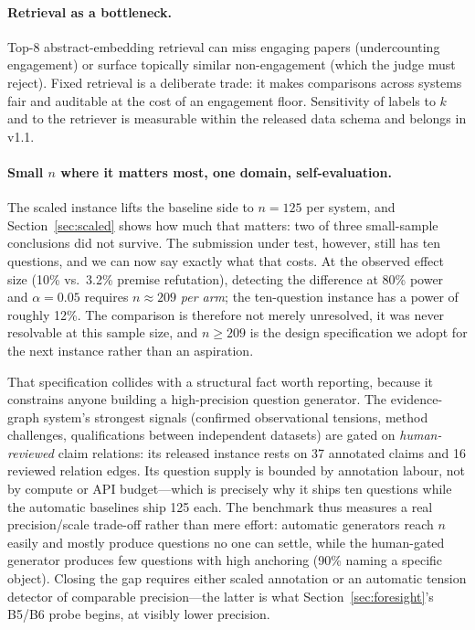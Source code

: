 \paragraph{Retrieval as a bottleneck.} Top-8 abstract-embedding
retrieval can miss engaging papers (undercounting engagement) or
surface topically similar non-engagement (which the judge must reject).
Fixed retrieval is a deliberate trade: it makes comparisons across
systems fair and auditable at the cost of an engagement floor.
Sensitivity of labels to $k$ and to the retriever is measurable within
the released data schema and belongs in v1.1.

\paragraph{Small $n$ where it matters most, one domain,
self-evaluation.} The scaled instance lifts the baseline side to
$n=125$ per system, and Section~\ref{sec:scaled} shows how much that
matters: two of three small-sample conclusions did not survive. The
submission under test, however, still has ten questions, and we can now
say exactly what that costs. At the observed effect size (10\% vs.\
3.2\% premise refutation), detecting the difference at 80\% power and
$\alpha=0.05$ requires $n\approx209$ \emph{per arm}; the ten-question
instance has a power of roughly 12\%. The comparison is therefore not
merely unresolved, it was never resolvable at this sample size, and
$n\geq209$ is the design specification we adopt for the next instance
rather than an aspiration.

That specification collides with a structural fact worth reporting,
because it constrains anyone building a high-precision question
generator. The evidence-graph system's strongest signals (confirmed
observational tensions, method challenges, qualifications between
independent datasets) are gated on \emph{human-reviewed} claim
relations: its released instance rests on 37 annotated claims and 16
reviewed relation edges. Its question supply is bounded by annotation
labour, not by compute or API budget---which is precisely why it ships
ten questions while the automatic baselines ship 125 each. The
benchmark thus measures a real precision/scale trade-off rather than
mere effort: automatic generators reach $n$ easily and mostly produce
questions no one can settle, while the human-gated generator produces
few questions with high anchoring (90\% naming a specific object).
Closing the gap requires either scaled annotation or an automatic
tension detector of comparable precision---the latter is what
Section~\ref{sec:foresight}'s B5/B6 probe begins, at visibly lower
precision.

